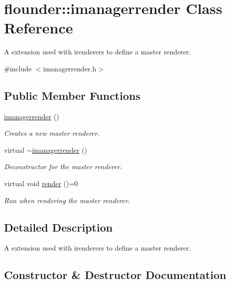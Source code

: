 \hypertarget{classflounder_1_1imanagerrender}{}\section{flounder\+:\+:imanagerrender Class Reference}
\label{classflounder_1_1imanagerrender}


A extension used with irenderers to define a master renderer.  




{\ttfamily \#include $<$imanagerrender.\+h$>$}

\subsection*{Public Member Functions}
\begin{DoxyCompactItemize}
\item 
\hyperlink{classflounder_1_1imanagerrender_ada5d5c91beb519900e79957f631dc4e0}{imanagerrender} ()
\begin{DoxyCompactList}\small\item\em Creates a new master renderer. \end{DoxyCompactList}\item 
virtual \hyperlink{classflounder_1_1imanagerrender_abcc4d43e01ff6315c58a9df1b091aca0}{$\sim$imanagerrender} ()
\begin{DoxyCompactList}\small\item\em Deconstructor for the master renderer. \end{DoxyCompactList}\item 
virtual void \hyperlink{classflounder_1_1imanagerrender_a7cb8095219bd72cd974043adcbc908b4}{render} ()=0
\begin{DoxyCompactList}\small\item\em Run when rendering the master renderer. \end{DoxyCompactList}\end{DoxyCompactItemize}


\subsection{Detailed Description}
A extension used with irenderers to define a master renderer. 



\subsection{Constructor \& Destructor Documentation}
\mbox{\label{classflounder_1_1imanagerrender_ada5d5c91beb519900e79957f631dc4e0}} 
